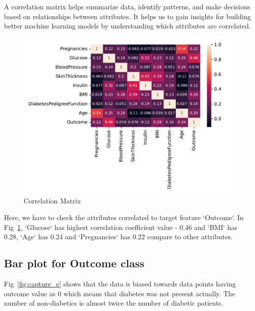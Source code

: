 A correlation matrix helps summarize data, identify patterns, and make decisions based on relationships between attributes. It helps us to gain insights for building better machine learning models by understanding which attributes are correlated.

\begin{figure}[ht]
    \centering    \includegraphics[scale=0.8]{figures/data_correlation.pdf}
    \caption{Correlation Matrix}
    \label{fig:capture_c}
\end{figure} 

Here, we have to check the attributes correlated to target feature `Outcome`. In Fig~\ref{fig:capture_c}, `Glucose` has highest correlation coefficient value - 0.46 and `BMI` has 0.28, `Age` has 0.24 and `Pregnancies` has 0.22 compare to other attributes.

\subsection{Bar plot for Outcome class}
Fig~\ref{fig:capture_e} shows that the data is biased towards data points having outcome value as 0 which means that diabetes was not present actually. The number of non-diabetics is almost twice the number of diabetic patients.

